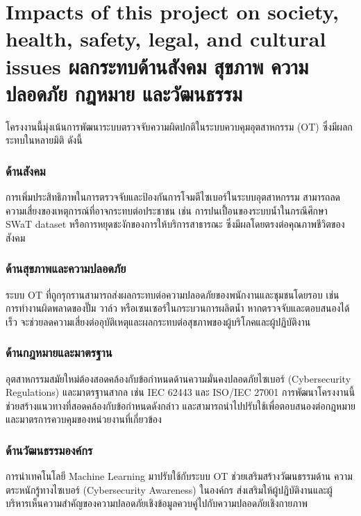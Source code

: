 \section{\ifenglish%
Impacts of this project on society, health, safety, legal, and cultural issues
\else%
ผลกระทบด้านสังคม สุขภาพ ความปลอดภัย กฎหมาย และวัฒนธรรม
\fi}

\hspace{2em} โครงงานนี้มุ่งเน้นการพัฒนาระบบตรวจจับความผิดปกติในระบบควบคุมอุตสาหกรรม (OT) ซึ่งมีผลกระทบในหลายมิติ ดังนี้

\subsubsection{ด้านสังคม}
    \hspace{2em} การเพิ่มประสิทธิภาพในการตรวจจับและป้องกันการโจมตีไซเบอร์ในระบบอุตสาหกรรม สามารถลด \\ ความเสี่ยงของเหตุการณ์ที่อาจกระทบต่อประชาชน เช่น การปนเปื้อนของระบบน้ำในกรณีศึกษา \\ SWaT dataset หรือการหยุดชะงักของการให้บริการสาธารณะ ซึ่งมีผลโดยตรงต่อคุณภาพชีวิตของสังคม

\subsubsection{ด้านสุขภาพและความปลอดภัย}
    \hspace{2em} ระบบ OT ที่ถูกรุกรานสามารถส่งผลกระทบต่อความปลอดภัยของพนักงานและชุมชนโดยรอบ เช่น การทำงานผิดพลาดของปั๊ม วาล์ว หรือเซนเซอร์ในกระบวนการผลิตน้ำ หากตรวจจับและตอบสนองได้เร็ว จะช่วยลดความเสี่ยงต่ออุบัติเหตุและผลกระทบต่อสุขภาพของผู้บริโภคและผู้ปฏิบัติงาน

\subsubsection{ด้านกฎหมายและมาตรฐาน}
    \hspace{2em} อุตสาหกรรมสมัยใหม่ต้องสอดคล้องกับข้อกำหนดด้านความมั่นคงปลอดภัยไซเบอร์ (Cybersecurity Regulations) และมาตรฐานสากล เช่น IEC 62443 และ ISO/IEC 27001 การพัฒนาโครงงานนี้ช่วยสร้างแนวทางที่สอดคล้องกับข้อกำหนดดังกล่าว และสามารถนำไปปรับใช้เพื่อตอบสนองต่อกฎหมาย \\ และมาตรการควบคุมของหน่วยงานที่เกี่ยวข้อง

\subsubsection{ด้านวัฒนธรรมองค์กร}
    \hspace{2em} การนำเทคโนโลยี Machine Learning มาปรับใช้กับระบบ OT ช่วยเสริมสร้างวัฒนธรรมด้าน ความตระหนักรู้ทางไซเบอร์ (Cybersecurity Awareness) ในองค์กร ส่งเสริมให้ผู้ปฏิบัติงานและผู้บริหารเห็นความสำคัญของความปลอดภัยเชิงข้อมูลควบคู่ไปกับความปลอดภัยเชิงกายภาพ
